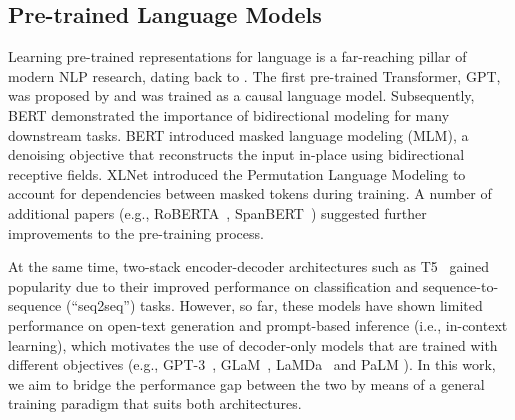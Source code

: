 \documentclass[10pt]{article}
\begin{document}
\subsection{Pre-trained Language Models}
Learning pre-trained representations for language is a far-reaching pillar of modern NLP research, dating back to \citep{mikolov2013distributed,pennington2014glove,neumann2018deep,dai2015semi,howard2018universal}. The first pre-trained Transformer, GPT, was proposed by \citep{Radford2019} and was trained as a causal language model. Subsequently, BERT \citep{devlin2018bert} demonstrated the importance of bidirectional modeling for many downstream tasks. BERT introduced masked language modeling (MLM), a denoising objective that reconstructs the input in-place using bidirectional receptive fields. XLNet \cite{yang2019xlnet} introduced the Permutation Language Modeling to account for dependencies between masked tokens during training. A number of additional papers (e.g., RoBERTA~\citep{liu2019roberta}, SpanBERT~\citep{joshi2020spanbert}) suggested further improvements to the pre-training process. 

At the same time, two-stack encoder-decoder architectures such as T5~\citep{raffel2019exploring} gained popularity due to their improved performance on classification and sequence-to-sequence (``seq2seq'') tasks. However, so far, these models have shown limited performance on open-text generation and prompt-based inference (i.e., in-context learning), which motivates the use of decoder-only models that are trained with different objectives (e.g., GPT-3~\citep{brown2020language}, GLaM~\citep{du2021glam}, LaMDa~\citep{thoppilan2022lamda} and PaLM \citep{chowdhery2022palm}). In this work, we aim to bridge the performance gap between the two by means of a general training paradigm that suits both architectures.
\end{document}
